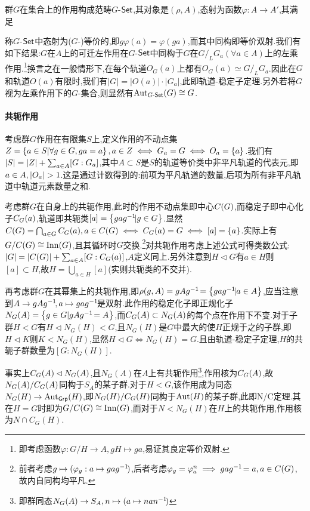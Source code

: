 \documentclass[11pt]{article} %
\begin{document}
群$G$在集合上的作用构成范畴$G$-$\mathsf{Set}$,其对象是$(\rho,A)$,态射为函数$\varphi:A\to A'$,其满足
称$G$-$\mathsf{Set}$中态射为($G$-)等价的,即$g\varphi(a)=\varphi(ga)$,而其中同构即等价双射.我们有如下结果:$G$在$A$上的可迁左作用在$G$-$\mathsf{Set}$中同构于$G$在$G/_L G_a(\forall a\in A)$上的左乘作用.\footnote{即考虑函数$\varphi:G/H\to A, gH\mapsto ga$,易证其良定等价双射.}换言之在一般情形下,在每个轨道$O_G(a)$上都有$O_G(a)\simeq G/_L G_a$.因此在$G$和轨道$O(a)$有限时,我们有$|G|=|O(a)|\cdot |G_a|$,此即轨道-稳定子定理.另外若将$G$视为左乘作用下的$G$-集合,则显然有$\operatorname{Aut}_{G\textrm{-}\mathsf{Set}}(G)\cong G$.

\paragraph{共轭作用}
考虑群$G$作用在有限集$S$上,定义作用的不动点集$Z=\left\{a\in S | \forall g\in G, ga=a\right\}, a\in Z\iff G_a=G\iff O_a=\left\{a\right\}$.我们有$\left|S\right|=\left|Z\right|+\sum_{a\in A}[G:G_a]$,其中$A\subset S$是$S$的轨道等价类中非平凡轨道的代表元,即$a\in A, \abs{O_a}>1$.这是通过计数得到的:前项为平凡轨道的数量,后项为所有非平凡轨道中轨道元素数量之和.

考虑群$G$在自身上的共轭作用,此时的作用不动点集即中心$C(G)$,而稳定子即中心化子$C_G(a)$,轨道即共轭类$[a]=\left\{gag^{-1}\! | g\in G\right\}$.显然$C(G)=\bigcap_{a\in G}C_G(a), a\in C(G)\iff C_G(a)=G\iff [a]=\left\{a\right\}$.实际上有$G/C(G)\cong\operatorname{Inn}(G)$,且其循环时$G$交换.\footnote{前者考虑$g\mapsto (\varphi_g: a\mapsto gag^{-1}\!)$,后者考虑$\varphi_g=\varphi_a^n\implies gag^{-1}\!=a, a\in C(G)$,故内自同构均平凡.}对共轭作用考虑上述公式可得类数公式:$\left|G\right|=\left|C(G)\right|+\sum_{a\in A}[G:C_G(a)]$,$A$定义同上.另外注意到$H\lhd G$有$a\in H$则$[a]\subset H$,故$H=\bigcup_{a\in H}[a]$(实则共轭类的不交并).

再考虑群$G$在其幂集上的共轭作用,即$\rho(g,A)=gAg^{-1}\!=\left\{gag^{-1}\! | a\in A\right\}$,应当注意到$A\to gAg^{-1}\!, a\mapsto gag^{-1}\!$是双射.此作用的稳定化子即正规化子$N_G(A)=\left\{g\in G|gAg^{-1}\!=A\right\}$,而$C_G(A)\subset N_G(A)$的每个点在作用下不变.对于子群$H<G$有$H\lhd N_G(H)<G$,且$N_G(H)$是$G$中最大的使$H$正规于之的子群,即$H\lhd K$则$K<N_G(H)$,显然$H\lhd G\iff N_G(H)=G$.且由轨道-稳定子定理,$H$的共轭子群数量为$[G:N_G(H)]$.

事实上$C_G(A)\lhd N_G(A)$,且$N_G(A)$在$A$上有共轭作用\footnote{即群同态$N_G(A)\to S_A, n\mapsto (a\mapsto nan^{-1}\!)$},作用核为$C_G(A)$,故$N_G(A)/C_G(A)$同构于$S_A$的某子群.对于$H<G$,该作用成为同态$N_G(H)\to \operatorname{Aut}_{\mathsf{Grp}}(H)$,即$N_G(H)/C_G(H)$同构于$\operatorname{Aut}(H)$的某子群,此即N/C定理.其在$H=G$时即为$G/C(G)\cong \operatorname{Inn}(G)$,而对于$N<N_G(H)$在$H$上的共轭作用,作用核为$N\cap C_G(H)$.
\end{document}
